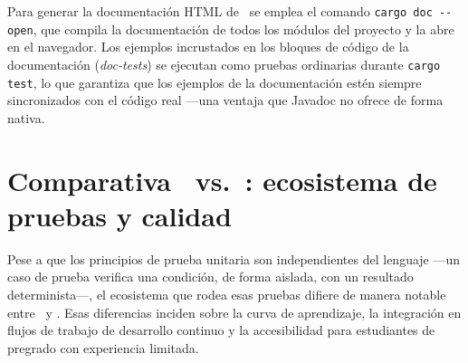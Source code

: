 \noindent
Para generar la documentación HTML de \rust\ se emplea el comando \texttt{cargo doc -{}-open},
que compila la documentación de todos los módulos del proyecto y la abre en el navegador.
Los ejemplos incrustados en los bloques de código de la documentación (\textit{doc-tests})
se ejecutan como pruebas ordinarias durante \texttt{cargo test}, lo que garantiza que los
ejemplos de la documentación estén siempre sincronizados con el código real ---una
ventaja que Javadoc no ofrece de forma nativa.


\section{Comparativa \java\ vs.\ \rust: ecosistema de pruebas y calidad}
\label{sec:java-rust-pruebas}

Pese a que los principios de prueba unitaria son independientes del lenguaje ---un caso de
prueba verifica una condición, de forma aislada, con un resultado determinista---, el
ecosistema que rodea esas pruebas difiere de manera notable entre \java\ y \rust. Esas
diferencias inciden sobre la curva de aprendizaje, la integración en flujos de trabajo
de desarrollo continuo y la accesibilidad para estudiantes de pregrado con experiencia limitada.

